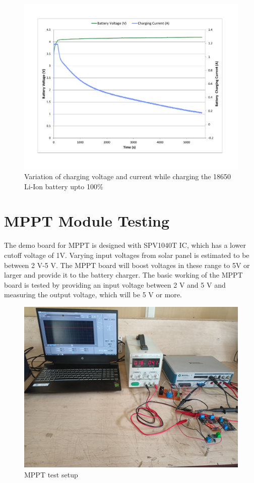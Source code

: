 \begin{figure}[H]
	\centering
	\includegraphics[width=\columnwidth]{IMGS/Battery Charge Cycle.pdf}
	\caption{Variation of charging voltage and current while charging the 18650 Li-Ion battery upto 100\%}
	\label{fig:chargin'}
\end{figure}
\section{MPPT Module Testing}

The demo board for MPPT is designed with SPV1040T IC, which has a lower cutoff voltage of 1V. Varying input voltages from solar panel is estimated to be between 2 V-5 V. The MPPT board will boost voltages in these range to 5V or larger and provide it to the battery charger. The basic working of the MPPT board is tested by providing an input voltage between 2 V and 5 V and measuring the output voltage, which will be 5 V or more.

\begin{figure}[H]
	\centering
	\includegraphics[width=0.7\columnwidth]{IMGS/TestSetupPics/TESTPIC_MPPT_MODULE.jpg}
	\caption{MPPT test setup}
	\label{fig:arch}
\end{figure}


